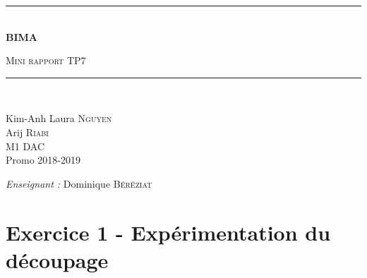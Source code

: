 \documentclass[a4paper]{article}
\newcommand{\HRule}{\rule{\linewidth}{0.5mm}}
\begin{document}
\begin{titlepage}
  \begin{center}


      \vspace{4cm}
    \HRule \\[0.4cm]
    { \huge \bfseries BIMA\\[0.4cm] }

      \textsc{\LARGE Mini rapport TP7}\\[0.4cm]

    \HRule \\[0.8cm]

    \begin{minipage}{0.4\textwidth}
      \begin{flushleft} \large
        Kim-Anh Laura \textsc{Nguyen}\\
        \large
        Arij \textsc{Riabi}\\
        M1 DAC\\
        Promo 2018-2019 \\
      \end{flushleft}
    \end{minipage}
    \begin{minipage}{0.5\textwidth}
      \begin{flushright} \large
        \emph{Enseignant :} Dominique \textsc{Béréziat}\\
      \end{flushright}
    \end{minipage}

      \vspace{2cm}

  \end{center}
\end{titlepage}

\newpage

\section*{Exercice 1 - Expérimentation du découpage}
\end{document}
